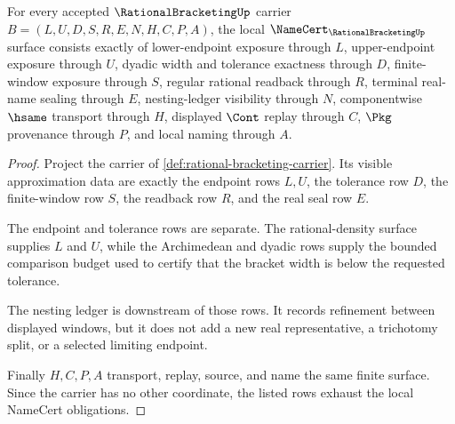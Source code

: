\begin{theorem}
\label{thm:rational-bracketing-namecert-obligations}
For every accepted $\RationalBracketingUp$ carrier $B=(L,U,D,S,R,E,N,H,C,P,A)$, the local $\NameCert_{\RationalBracketingUp}$ surface consists exactly of lower-endpoint exposure through $L$, upper-endpoint exposure through $U$, dyadic width and tolerance exactness through $D$, finite-window exposure through $S$, regular rational readback through $R$, terminal real-name sealing through $E$, nesting-ledger visibility through $N$, componentwise $\hsame$ transport through $H$, displayed $\Cont$ replay through $C$, $\Pkg$ provenance through $P$, and local naming through $A$.
\end{theorem}
\begin{proof}
Project the carrier of \autoref{def:rational-bracketing-carrier}. Its visible approximation data are exactly the endpoint rows $L,U$, the tolerance row $D$, the finite-window row $S$, the readback row $R$, and the real seal row $E$.

The endpoint and tolerance rows are separate. The rational-density surface supplies $L$ and $U$, while the Archimedean and dyadic rows supply the bounded comparison budget used to certify that the bracket width is below the requested tolerance.

The nesting ledger is downstream of those rows. It records refinement between displayed windows, but it does not add a new real representative, a trichotomy split, or a selected limiting endpoint.

Finally $H,C,P,A$ transport, replay, source, and name the same finite surface. Since the carrier has no other coordinate, the listed rows exhaust the local NameCert obligations.
\end{proof}


